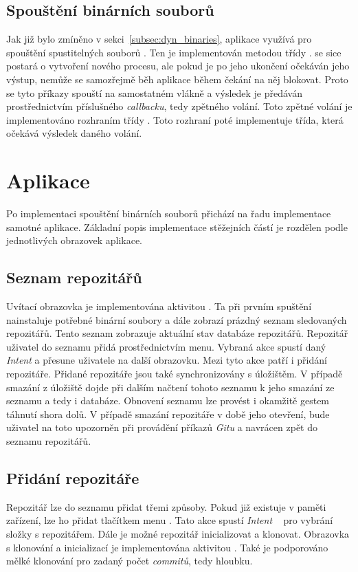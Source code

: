     \subsection{Spouštění binárních souborů}
    Jak již bylo zmíněno v sekci~\ref{subsec:dyn_binaries}, aplikace využívá pro spouštění spustitelných souborů . Ten je implementován metodou  třídy .  se sice postará o vytvoření nového procesu, ale pokud je po jeho ukončení očekáván jeho výstup, nemůže se samozřejmě běh aplikace během čekání na něj blokovat. Proto se tyto příkazy spouští na samostatném vlákně a výsledek je předáván prostřednictvím příslušného \emph{callbacku}, tedy zpětného volání. Toto zpětné volání je implementováno rozhraním  třídy . Toto rozhraní poté implementuje třída, která očekává výsledek daného volání.

\section{Aplikace}
Po implementaci spouštění binárních souborů přichází na řadu implementace samotné aplikace. Základní popis implementace stěžejních částí je rozdělen podle jednotlivých obrazovek aplikace.

    \subsection{Seznam repozitářů}
    Uvítací obrazovka je implementována aktivitou . Ta při prvním spuštění nainstaluje potřebné binární soubory a dále zobrazí prázdný seznam sledovaných repozitářů. Tento seznam zobrazuje aktuální stav databáze repozitářů. Repozitář uživatel do seznamu přidá prostřednictvím menu. Vybraná akce spustí daný \emph{Intent} a přesune uživatele na další obrazovku. Mezi tyto akce patří i přidání repozitáře. Přidané repozitáře jsou také synchronizovány s úložištěm. V případě smazání z úložiště dojde při dalším načtení tohoto seznamu k jeho smazání ze seznamu a tedy i databáze. Obnovení seznamu lze provést i okamžitě gestem táhnutí shora dolů. V případě smazání repozitáře v době jeho otevření, bude uživatel na toto upozorněn při provádění příkazů \emph{Gitu} a navrácen zpět do seznamu repozitářů. 

    \subsection{Přidání repozitáře}
    Repozitář lze do seznamu přidat třemi způsoby. Pokud již existuje v paměti zařízení, lze ho přidat tlačítkem menu . Tato akce spustí \emph{Intent} ~ pro vybrání složky s repozitářem. Dále je možné repozitář inicializovat a klonovat. Obrazovka s klonování a inicializací je implementována aktivitou . Také je podporováno mělké klonování pro zadaný počet \emph{commitů}, tedy hloubku.

